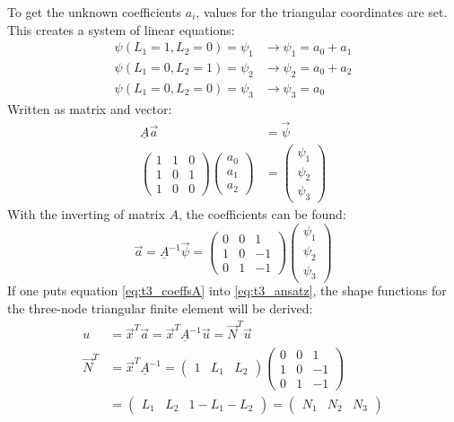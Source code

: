   To get the unknown coefficients $a_i$, values for the triangular coordinates are set. This creates a system of linear equations:
  \begin{align}
  \psi(L_1=1, L_2=0) = \psi_1 &\rightarrow \psi_1 = a_0 + a_1 \nonumber\\
  \psi(L_1=0, L_2=1) = \psi_2 &\rightarrow \psi_2 = a_0 + a_2 \nonumber\\
  \psi(L_1=0, L_2=0) = \psi_3 &\rightarrow \psi_3 = a_0
  \end{align}
  Written as matrix and vector:
  \begin{align}
  \underline{A} \vec{a} &= \vec{\psi} \nonumber\\
  \begin{pmatrix}
  1 & 1 & 0\\
  1 & 0 & 1\\
  1 & 0 & 0
  \end{pmatrix} \begin{pmatrix}
  a_0 \\ a_1 \\ a_2
  \end{pmatrix} &= \begin{pmatrix}
  \psi_1 \\ \psi_2 \\ \psi_3
  \end{pmatrix}
  \end{align}
  With the inverting of matrix $A$, the coefficients can be found:
  \begin{equation}\label{eq:t3_coeffsA}
  \vec{a} = \underline{A}^{-1} \vec{\psi} = \begin{pmatrix}
  0 & 0 & 1\\
  1 & 0 & -1\\
  0 & 1 & -1
  \end{pmatrix} \begin{pmatrix}
  \psi_1 \\ \psi_2 \\ \psi_3
  \end{pmatrix}
  \end{equation}
  If one puts equation \eqref{eq:t3_coeffsA} into \eqref{eq:t3_ansatz}, the shape functions for the three-node triangular finite element will be derived:
  \begin{align}\label{eq:t3SF}
  u &= \vec{x}^T \vec{a} = \vec{x}^T \underline{A}^{-1}\vec{u} = \vec{N}^T\vec{u} \nonumber\\
  \vec{N}^T &= \vec{x}^T \underline{A}^{-1} =
  \begin{pmatrix}
  1 & L_1 & L_2
  \end{pmatrix} \begin{pmatrix}
  0 & 0 & 1\\
  1 & 0 & -1\\
  0 & 1 & -1
  \end{pmatrix} \nonumber\\
  &= \begin{pmatrix}
  L_1 & L_2 & 1-L_1-L_2
  \end{pmatrix} = \begin{pmatrix}
  N_1 & N_2 & N_3
  \end{pmatrix}
  \end{align}
